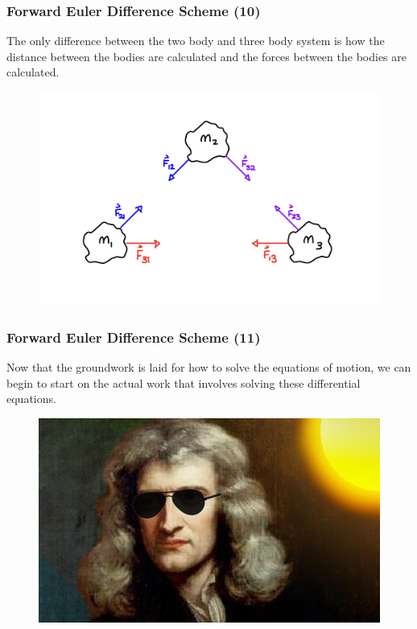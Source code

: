 \documentclass{beamer}
\begin{document}
\begin{frame}
\frametitle{Forward Euler Difference Scheme (10)}
The only difference between the two body and three body system is how the distance between the bodies are calculated and the forces between the bodies are calculated.
\begin{figure}[htpb]
\begin{center}
\includegraphics[width=0.85\linewidth]{3BodyCartoon1.png} 
\end{center}
\end{figure}
\end{frame}
\begin{frame}
\frametitle{Forward Euler Difference Scheme (11)}
Now that the groundwork is laid for how to solve the equations of motion, we can begin to start on the actual work that involves solving these differential equations.
\begin{figure}[htpb]
\begin{center}
\includegraphics[width=0.85\linewidth]{IsaacNewton.jpg} 
\end{center}
\end{figure}
\end{frame}
\end{document}

